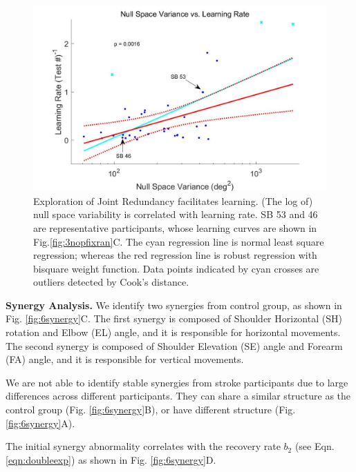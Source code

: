 \begin{figure}
	\centering
	\includegraphics[width=1\linewidth]{figures/5learnRateVSnullVar}
	\caption[Exploration of Joint Redundancy facilitates learning]
	{Exploration of Joint Redundancy facilitates learning. 
		(The log of) null space variability is correlated with learning rate.
		SB 53 and 46 are representative participants, whose learning curves are shown in Fig.\ref{fig:3nopfixran}C.
		The cyan regression line is normal least square regression; whereas the red regression line is robust regression with bisquare weight function. 
		Data points indicated by cyan crosses are outliers detected by Cook's distance.}
	\label{fig:5learnratevsnullvar}
\end{figure}

\textbf{Synergy Analysis.}
We identify two synergies from control group, as shown in Fig. \ref{fig:6synergy}C.
The first synergy is composed of Shoulder Horizontal (SH) rotation and Elbow (EL) angle, and it is responsible for horizontal movements.
The second synergy is composed of Shoulder Elevation (SE) angle and Forearm (FA) angle, and it is responsible for vertical movements.

We are not able to identify stable synergies from stroke participants due to large differences across different participants.
They can share a similar structure as the control group (Fig. \ref{fig:6synergy}B), or have different structure (Fig. \ref{fig:6synergy}A).

The initial synergy abnormality correlates with the recovery rate $ b_2 $ (see Eqn. \ref{eqn:doubleexp}) as shown in Fig. \ref{fig:6synergy}D.







